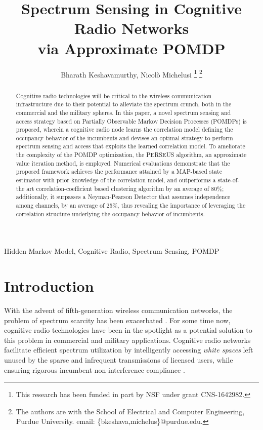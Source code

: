 \documentclass[10pt,twocolumn]{IEEEtran}
\title{Spectrum Sensing in Cognitive Radio Networks
\\
via Approximate POMDP}
\author{Bharath Keshavamurthy, Nicol\`{o} Michelusi
\thanks{This research has been funded in part by NSF under grant CNS-1642982.}
\thanks{The authors are with the School of Electrical and Computer Engineering, Purdue University. email: \{bkeshava,michelus\}@purdue.edu.}
\vspace{-5mm}}
\begin{document}
 
\maketitle
{}
\begin{abstract}
Cognitive radio technologies will be critical to the wireless communication infrastructure due to their potential to alleviate the spectrum crunch, both in the commercial and the military spheres. In this paper, a novel spectrum sensing and access strategy based on Partially Observable Markov Decision Processes (POMDPs) is proposed, wherein a cognitive radio node learns the correlation model defining the occupancy behavior of the incumbents and devises an optimal strategy to perform spectrum sensing and access that exploits the learned correlation model. To ameliorate the complexity of the POMDP optimization, the PERSEUS algorithm, an approximate value iteration method, is employed. Numerical evaluations demonstrate that the proposed framework achieves the performance attained by a MAP-based state estimator with prior knowledge of the correlation model, and outperforms a state-of-the art correlation-coefficient based clustering algorithm by an average of 80\%; additionally, it surpasses a Neyman-Pearson Detector that assumes independence among channels, by an average of 25\%, thus revealing the importance of leveraging the correlation structure underlying the occupancy behavior of incumbents.
\end{abstract}
\begin{IEEEkeywords}
Hidden Markov Model, Cognitive Radio, Spectrum Sensing, POMDP
\end{IEEEkeywords}
\section{Introduction}\label{I}
With the advent of fifth-generation wireless communication networks, the problem of spectrum scarcity has been exacerbated \cite{7158089}. For some time now, cognitive radio technologies have been in the spotlight as a potential solution to this problem in commercial and military applications. Cognitive radio networks facilitate efficient spectrum utilization by intelligently accessing \emph{white spaces} left unused by the sparse and infrequent transmissions of licensed users, while ensuring rigorous incumbent non-interference compliance \cite{4562537}. 
\end{document}
